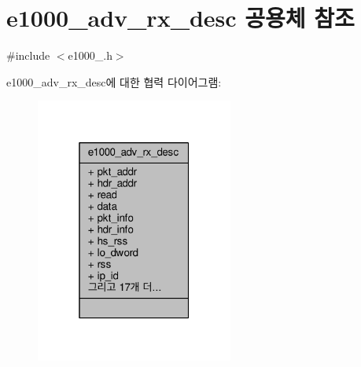 \hypertarget{unione1000__adv__rx__desc}{}\section{e1000\+\_\+adv\+\_\+rx\+\_\+desc 공용체 참조}
\label{unione1000__adv__rx__desc}


{\ttfamily \#include $<$e1000\+\_.\+h$>$}



e1000\+\_\+adv\+\_\+rx\+\_\+desc에 대한 협력 다이어그램\+:
\nopagebreak
\begin{figure}[H]
\begin{center}
\leavevmode
\includegraphics[width=184pt]{unione1000__adv__rx__desc__coll__graph}
\end{center}
\end{figure}
